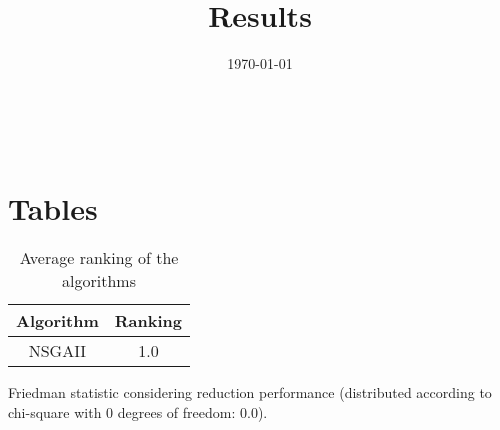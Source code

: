 \documentclass{article}
\title{Results}
\author{}
\date{\today}
\begin{document}
\oddsidemargin 0in \topmargin 0in\maketitle
\
\section{Tables}
\begin{table}[!htp]
\centering
\caption{Average ranking of the algorithms}
\begin{tabular}{c|c}
Algorithm&Ranking\\
\hline
NSGAII&1.0\\
\end{tabular}
\end{table}


Friedman statistic considering reduction performance (distributed according to chi-square with 0 degrees of freedom: 0.0).
\end{document}
